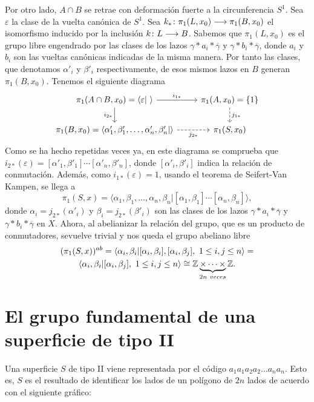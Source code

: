 \documentclass[GTS.tex]{subfiles}
\begin{document}
Por otro lado, $A\cap B$ se retrae con deformación fuerte a la circunferencia $S^1$. Sea $\varepsilon$  la clase de la vuelta canónica de $S^1$. Sea $k_*\colon{\pi_1(L,x_0)}\longrightarrow{\pi_1(B,x_0)}$ el isomorfismo inducido por la inclusión $k\colon{L}\longrightarrow{B}$. Sabemos que $\pi_1(L,x_0)$ es el grupo libre engendrado por las clases de los lazos $\gamma*a_i*\overline{\gamma}$ y $\gamma*b_i*\overline{\gamma}$, donde $a_i$ y $b_i$ son las vueltas canónicas indicadas de la misma manera.  Por tanto las clases, que denotamos $\alpha'_i$ y $\beta'_i$ respectivamente, de esos mismos lazos en $B$ generan $\pi_1(B,x_0)$. Tenemos el siguiente diagrama
\[
\begin{tikzcd}
\pi_1(A\cap B,x_0)=\langle\varepsilon|\ \rangle \ar[r, "i_{1*}"]\arrow[d,"i_{2*}"'] & \pi_1(A,x_0)=\{1\}\arrow[d, dashed, "j_{1*}"]\\
\pi_1(B,x_0)=\langle \alpha'_1,\beta'_1,\dots,\alpha'_n,\beta'_n| \rangle\arrow[r,dashed,"j_{2*}"'] & \pi_1(S,x_0)
\end{tikzcd}
\]
Como se ha hecho repetidas veces ya, en este diagrama se comprueba que $i_{2*}(\varepsilon)=[\alpha'_1,\beta'_1]\cdots[\alpha'_n,\beta'_n]$, donde $[\alpha'_i,\beta'_i]$ indica la relación de conmutación. Además, como $i_{1*}(\varepsilon)=1$, usando el teorema de Seifert-Van Kampen, se llega a 
\[
\pi_1(S,x)=\langle \alpha_1,\beta_1,\dots,\alpha_n,\beta_n|[\alpha_1,\beta_1]\cdots[\alpha_n,\beta_n]\rangle,
\]
donde $\alpha_i=j_{2*}(\alpha'_i)$ y $\beta_i=j_{2*}(\beta'_i)$ son las clases de los lazos  $\gamma*a_i*\overline{\gamma}$ y $\gamma*b_i*\overline{\gamma}$ en $X$. Ahora, al abelianizar la relación del grupo, que es un producto de conmutadores, sevuelve trivial y nos queda el grupo abeliano libre
\begin{gather*}
(\pi_1(S,x))^{ab}=\langle \alpha_i, \beta_i|[\alpha_i,\beta_i],[\alpha_i,\beta_j],\ 1\leq i, j\leq n\rangle=\\
\langle \alpha_i, \beta_i|[\alpha_i,\beta_j],\ 1\leq i, j\leq n\rangle\cong\mathbb{Z}\underbrace{\times\cdots\times}_{2n\ veces}\mathbb{Z}.
\end{gather*}


\section{El grupo fundamental de una superficie de tipo II}
Una superficie $S$ de tipo II viene representada por el código $a_1 a_1 a_2 a_2\dots a_n a_n$. Esto es, $S$ es el resultado de identificar los lados de un polígono de $2n$ lados de acuerdo con el siguiente gráfico:
\end{document}
